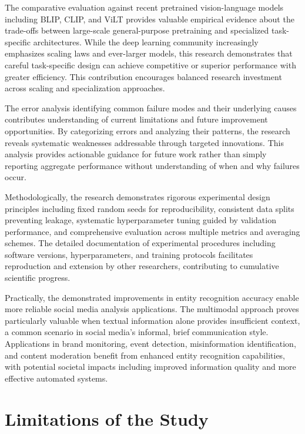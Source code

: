 \documentclass[12pt,a4paper]{report}
\begin{document}
The comparative evaluation against recent pretrained vision-language models including BLIP, CLIP, and ViLT provides valuable empirical evidence about the trade-offs between large-scale general-purpose pretraining and specialized task-specific architectures. While the deep learning community increasingly emphasizes scaling laws and ever-larger models, this research demonstrates that careful task-specific design can achieve competitive or superior performance with greater efficiency. This contribution encourages balanced research investment across scaling and specialization approaches.

The error analysis identifying common failure modes and their underlying causes contributes understanding of current limitations and future improvement opportunities. By categorizing errors and analyzing their patterns, the research reveals systematic weaknesses addressable through targeted innovations. This analysis provides actionable guidance for future work rather than simply reporting aggregate performance without understanding of when and why failures occur.

Methodologically, the research demonstrates rigorous experimental design principles including fixed random seeds for reproducibility, consistent data splits preventing leakage, systematic hyperparameter tuning guided by validation performance, and comprehensive evaluation across multiple metrics and averaging schemes. The detailed documentation of experimental procedures including software versions, hyperparameters, and training protocols facilitates reproduction and extension by other researchers, contributing to cumulative scientific progress.

Practically, the demonstrated improvements in entity recognition accuracy enable more reliable social media analysis applications. The multimodal approach proves particularly valuable when textual information alone provides insufficient context, a common scenario in social media's informal, brief communication style. Applications in brand monitoring, event detection, misinformation identification, and content moderation benefit from enhanced entity recognition capabilities, with potential societal impacts including improved information quality and more effective automated systems.

\section{Limitations of the Study}
\end{document}
